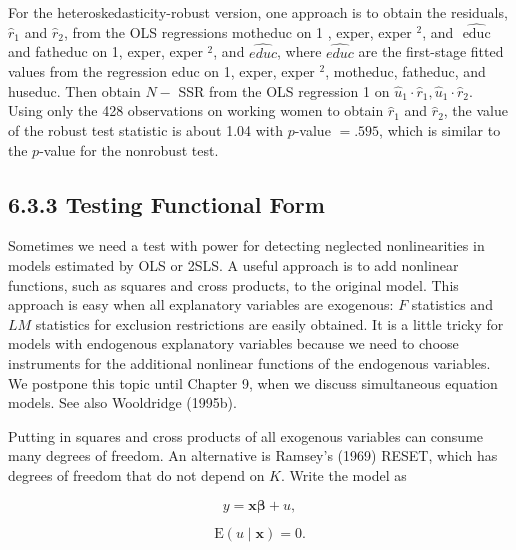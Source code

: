\documentclass[10pt]{article}
\begin{document}
For the heteroskedasticity-robust version, one approach is to obtain the residuals, $\hat{r}_{1}$ and $\hat{r}_{2}$, from the OLS regressions motheduc on 1 , exper, exper ${ }^{2}$, and $\widehat{\text { educ }}$ and fatheduc on 1, exper, exper ${ }^{2}$, and $\widehat{e d u c}$, where $\widehat{e d u c}$ are the first-stage fitted values from the regression educ on 1, exper, exper ${ }^{2}$, motheduc, fatheduc, and huseduc. Then obtain $N-$ SSR from the OLS regression 1 on $\hat{u}_{1} \cdot \hat{r}_{1}, \hat{u}_{1} \cdot \hat{r}_{2}$. Using only the 428 observations on working women to obtain $\hat{r}_{1}$ and $\hat{r}_{2}$, the value of the robust test statistic is about 1.04 with $p$-value $=.595$, which is similar to the $p$-value for the nonrobust test.

\subsection*{6.3.3 Testing Functional Form}
Sometimes we need a test with power for detecting neglected nonlinearities in models estimated by OLS or 2SLS. A useful approach is to add nonlinear functions, such as squares and cross products, to the original model. This approach is easy when all explanatory variables are exogenous: $F$ statistics and $L M$ statistics for exclusion restrictions are easily obtained. It is a little tricky for models with endogenous explanatory variables because we need to choose instruments for the additional nonlinear functions of the endogenous variables. We postpone this topic until Chapter 9, when we discuss simultaneous equation models. See also Wooldridge (1995b).

Putting in squares and cross products of all exogenous variables can consume many degrees of freedom. An alternative is Ramsey's (1969) RESET, which has degrees of freedom that do not depend on $K$. Write the model as


\begin{equation*}
y=\mathbf{x} \boldsymbol{\beta}+u, \tag{6.33}
\end{equation*}



\begin{equation*}
\mathrm{E}(u \mid \mathbf{x})=0 . \tag{6.34}
\end{equation*}
\end{document}
